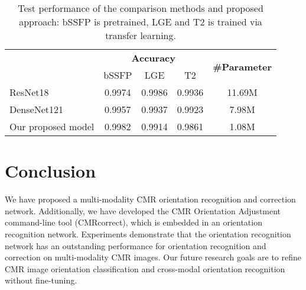 \documentclass[runningheads]{llncs}
\begin{document}
\begin{table}[htbp]
  \centering
  \caption{Test performance of the comparison methods and proposed approach: bSSFP is pretrained, LGE and T2 is trained via transfer learning.}
  \setlength{\tabcolsep}{4mm}
    \begin{tabular}{lcccc}
    \toprule
          & \multicolumn{3}{c}{\textbf{Accuracy}} & \multicolumn{1}{c}{\multirow{2}[4]{*}{\textbf{\#Parameter}}} \\
\cmidrule{2-4}          & bSSFP & LGE   & T2    &  \\
    \midrule
    ResNet18    & 0.9974    & 0.9986    & 0.9936    & 11.69M \\
    DenseNet121    & 0.9957    & 0.9937    & 0.9923    & 7.98M \\
    Our proposed model & 0.9982 & 0.9914 & 0.9861 & 1.08M\\

    \bottomrule
    \end{tabular}%
  \label{tab:result}%
\end{table}%



\section{Conclusion}

We have proposed a multi-modality CMR orientation recognition and correction network. Additionally, we have developed the CMR Orientation Adjustment command-line tool (CMRcorrect), which is embedded in an orientation recognition network. Experiments demonstrate that the orientation recognition network has an outstanding performance for orientation recognition and correction on multi-modality CMR images. Our future research goals are to refine CMR image orientation classification and cross-modal orientation recognition without fine-tuning.
\end{document}
